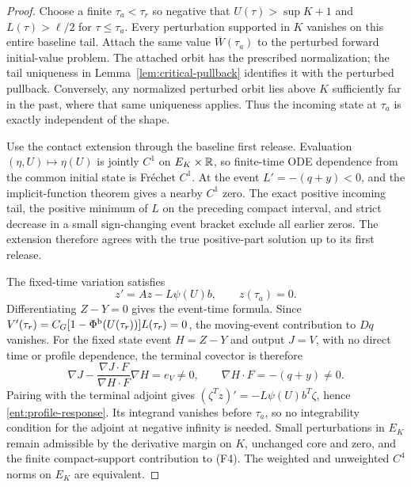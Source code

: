 \begin{proof}
Choose a finite $\tau_a<\tau_r$ so negative that
$U(\tau)>\sup K+1$ and $L(\tau)>\ell/2$ for
$\tau\le\tau_a$. Every perturbation supported in $K$ vanishes
on this entire baseline tail. Attach the same value
$\overline W(\tau_a)$ to the perturbed forward initial-value
problem. The attached orbit has the prescribed normalization;
the tail uniqueness in Lemma~\ref{lem:critical-pullback} identifies
it with the perturbed pullback. Conversely, any normalized perturbed
orbit lies above $K$ sufficiently far in the past, where that same
uniqueness applies. Thus the incoming state at $\tau_a$ is exactly
independent of the shape.

Use the contact extension through the baseline first release.
Evaluation $(\eta,U)\mapsto\eta(U)$ is jointly $C^1$ on
$E_K\times\mathbb R$, so finite-time ODE dependence from the common
initial state is Fr\'echet $C^1$. At the event
$L'=-(q+y)<0$, and the implicit-function theorem gives a nearby
$C^1$ zero. The exact positive incoming tail, the positive minimum
of $L$ on the preceding compact interval, and strict decrease in
a small sign-changing event bracket exclude all earlier zeros.
The extension therefore agrees with the true positive-part solution
up to its first release.

The fixed-time variation satisfies
\[
 z'=Az-L\psi(U)b,\qquad z(\tau_a)=0.
\]
Differentiating $Z-Y=0$ gives the event-time formula. Since
$V'(\tau_r)=C_G[1-\Phi^{\rm b}(U(\tau_r))]L(\tau_r)=0$,
the moving-event contribution to $Dq$ vanishes.
For the fixed state event $H=Z-Y$ and output $J=V$, with no direct
time or profile dependence, the terminal covector is therefore
\[
 \nabla J-\frac{\nabla J\cdot F}{\nabla H\cdot F}\nabla H
 =e_V\ne0,
 \qquad \nabla H\cdot F=-(q+y)\ne0.
\]
Pairing with the terminal adjoint gives
$(\zeta^Tz)'=-L\psi(U)b^T\zeta$, hence
\eqref{ent:profile-response}. Its integrand vanishes before
$\tau_a$, so no integrability condition for the adjoint at negative
infinity is needed. Small perturbations in $E_K$ remain admissible
by the derivative margin on $K$, unchanged core and zero, and the
finite compact-support contribution to (F4). The weighted and
unweighted $C^4$ norms on $E_K$ are equivalent.
\end{proof}

